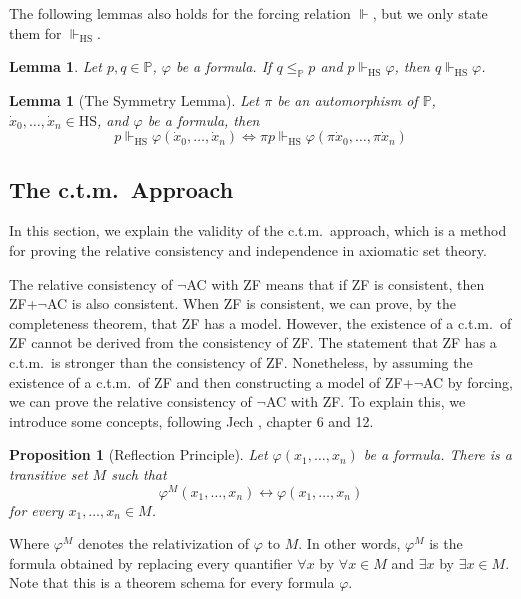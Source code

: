 \documentclass{report}
\newtheorem{lem}[thm]{Lemma}
\newtheorem{prop}[thm]{Proposition}
\begin{document}
The following lemmas also holds for the forcing relation $\Vdash$, but we only state them for $\Vdash_{\mathrm{HS}}$.

\begin{lem}\label{lem:strengthening}
  Let $p, q \in \mathbb{P}$, $\varphi$ be a formula. If $q \leq_{\mathbb{P}} p$ and $p \Vdash_{\mathrm{HS}} \varphi$, then $q \Vdash_{\mathrm{HS}} \varphi$.
\end{lem}

\begin{lem}[The Symmetry Lemma]\label{lem:symmetry_lemma}
  Let $\pi$ be an automorphism of $\mathbb{P}$, $\dot{x}_0, \ldots, \dot{x}_n \in \mathrm{HS}$, and $\varphi$ be a formula, then
  $$p \Vdash_{\mathrm{HS}} \varphi(\dot{x}_0, \ldots, \dot{x}_n) \Leftrightarrow \pi p \Vdash_{\mathrm{HS}} \varphi(\pi \dot{x}_0, \ldots, \pi \dot{x}_n)$$
\end{lem}


\subsection{The c.t.m.\  Approach}\label{subsection:ctm}
In this section, we explain the validity of the c.t.m.\  approach, 
which is a method for proving the relative consistency and independence in axiomatic set theory.

The relative consistency of $\neg$AC with ZF means that if ZF is consistent, then ZF+$\neg$AC is also consistent.
When ZF is consistent, we can prove, by the completeness theorem, that ZF has a model.
However, the existence of a c.t.m.\  of ZF cannot be derived from the consistency of ZF.
The statement that ZF has a c.t.m.\  is stronger than the consistency of ZF.
Nonetheless, by assuming the existence of a c.t.m.\  of ZF and then constructing a model of ZF+$\neg$AC by forcing, 
we can prove the relative consistency of $\neg$AC with ZF.
To explain this, we introduce some concepts,
following Jech \cite{jech_set_theory}, chapter 6 and 12.

\begin{prop}[Reflection Principle]
Let $\varphi(x_1, \ldots, x_n)$ be a formula. There is a transitive set $M$ such that 
$$\varphi^M(x_1, \ldots, x_n) \leftrightarrow \varphi(x_1, \ldots, x_n)$$
for every $x_1, \ldots, x_n \in M$.
\end{prop}
Where $\varphi^M$ denotes the relativization of $\varphi$ to $M$.
In other words, $\varphi^M$ is the formula obtained 
by replacing every quantifier $\forall x$ by $\forall x \in M$ and $\exists x$ by $\exists x \in M$.
Note that this is a theorem schema for every formula $\varphi$.
\end{document}
